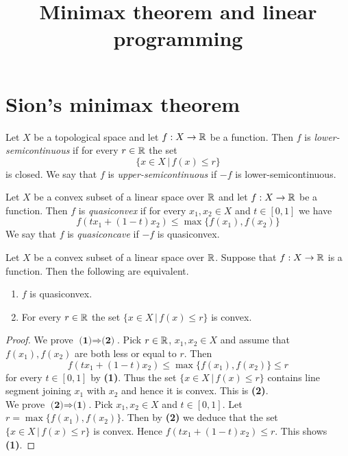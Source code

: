 



\title{Minimax theorem and linear programming}
\date{}
\maketitle

\section{Sion's minimax theorem}

\begin{definition}
Let $X$ be a topological space and let $f:X \rightarrow {\mathbb R}$ be a function. Then $f$ is \textit{lower-semicontinuous} if for every $r \in {\mathbb R}$ the set
$$\{x\in X\,|\,f(x) \leq r \}$$
is closed. We say that $f$ is \textit{upper-semicontinuous} if $-f$ is lower-semicontinuous.
\end{definition}

\begin{definition}
Let $X$ be a convex subset of a linear space over ${\mathbb R}$ and let $f:X \rightarrow {\mathbb R}$ be a function. Then $f$ is \textit{quasiconvex} if for every $x_1, x_2\in X$ and $t\in [0,1]$ we have
$$f\left(tx_1 + (1-t)x_2\right) \leq \max\big\{f(x_1),f(x_2)\big\}$$
We say that $f$ is \textit{quasiconcave} if $-f$ is quasiconvex.
\end{definition}

\begin{proposition}\label{proposition:characterizationofquasiconvexity}
Let $X$ be a convex subset of a linear space over ${\mathbb R}$. Suppose that $f:X \rightarrow {\mathbb R}$ is a function. Then the following are equivalent.
\begin{enumerate}[label=\emph{\textbf{(\arabic*)}}, leftmargin=3.0em]
\item $f$ is quasiconvex.
\item For every $r \in {\mathbb R}$ the set $\{x\in X\,|\,f(x)\leq r\}$ is convex.
\end{enumerate}
\end{proposition}
\begin{proof}
We prove $\textbf{(1)}\Rightarrow \textbf{(2)}$. Pick $r \in {\mathbb R}$, $x_1,x_2\in X$ and assume that $f(x_1), f(x_2)$ are both less or equal to $r$. Then
$$f\left(tx_1 + (1-t)x_2\right) \leq \max\big\{f(x_1),f(x_2)\big\} \leq r$$
for every $t\in [0,1]$ by \textbf{(1)}. Thus the set $\{x\in X\,|\,f(x)\leq r\}$ contains line segment joining $x_1$ with $x_2$ and hence it is convex. This is \textbf{(2)}.\\
We prove $\textbf{(2)}\Rightarrow \textbf{(1)}$. Pick $x_1,x_2\in X$ and $t\in [0,1]$. Let $r = \max\big\{f(x_1), f(x_2)\big\}$. Then by \textbf{(2)} we deduce that the set $\{x\in X\,|\,f(x)\leq r\}$ is convex. Hence $f\left(tx_1 + (1-t)x_2\right)\leq r$. This shows \textbf{(1)}.
\end{proof}

